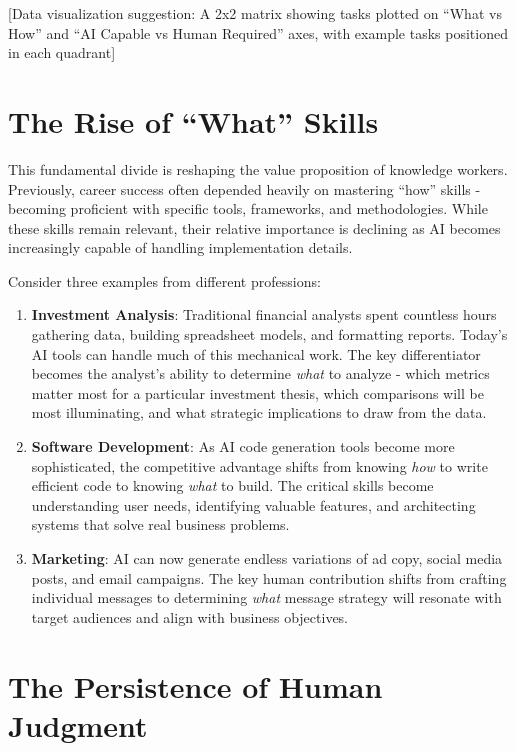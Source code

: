 \documentclass[
  Letterpaper,
]{scrbook}
\begin{document}
{[}Data visualization suggestion: A 2x2 matrix showing tasks plotted on
``What vs How'' and ``AI Capable vs Human Required'' axes, with example
tasks positioned in each quadrant{]}

\section{The Rise of ``What'' Skills}\label{the-rise-of-what-skills}

This fundamental divide is reshaping the value proposition of knowledge
workers. Previously, career success often depended heavily on mastering
``how'' skills - becoming proficient with specific tools, frameworks,
and methodologies. While these skills remain relevant, their relative
importance is declining as AI becomes increasingly capable of handling
implementation details.

Consider three examples from different professions:

\begin{enumerate}
\def\labelenumi{\arabic{enumi}.}
\item
  \textbf{Investment Analysis}: Traditional financial analysts spent
  countless hours gathering data, building spreadsheet models, and
  formatting reports. Today's AI tools can handle much of this
  mechanical work. The key differentiator becomes the analyst's ability
  to determine \emph{what} to analyze - which metrics matter most for a
  particular investment thesis, which comparisons will be most
  illuminating, and what strategic implications to draw from the data.
\item
  \textbf{Software Development}: As AI code generation tools become more
  sophisticated, the competitive advantage shifts from knowing
  \emph{how} to write efficient code to knowing \emph{what} to build.
  The critical skills become understanding user needs, identifying
  valuable features, and architecting systems that solve real business
  problems.
\item
  \textbf{Marketing}: AI can now generate endless variations of ad copy,
  social media posts, and email campaigns. The key human contribution
  shifts from crafting individual messages to determining \emph{what}
  message strategy will resonate with target audiences and align with
  business objectives.
\end{enumerate}

\section{The Persistence of Human
Judgment}\label{the-persistence-of-human-judgment}
\end{document}
